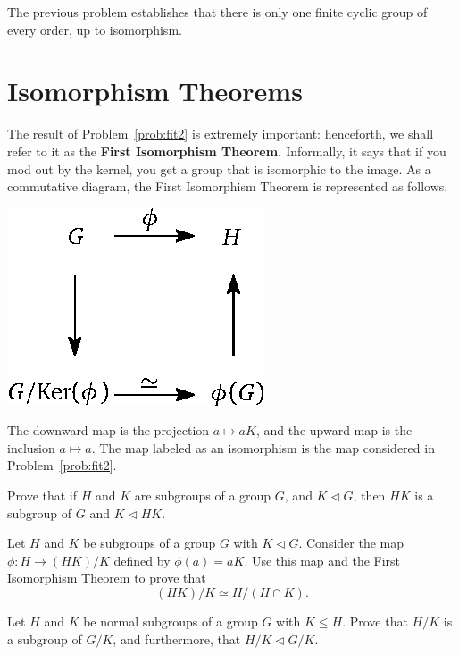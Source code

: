 The previous problem establishes that there is only one finite cyclic group of every order, up to isomorphism.

\section{Isomorphism Theorems}\label{sec:isothms}

The result of Problem~\ref{prob:fit2} is extremely important: henceforth, we shall refer to it as the \textbf{First Isomorphism Theorem.}
Informally, it says that if you mod out by the kernel, you get a group that is isomorphic to the image. As a commutative diagram, the First Isomorphism Theorem is represented as follows.
\begin{center}
\includegraphics{fit.eps}
\end{center}

The downward map is the projection \(a \mapsto aK\), and the upward map is the inclusion \(a \mapsto a\). The map labeled as an isomorphism is the map considered in Problem~\ref{prob:fit2}.

\begin{problem}
Prove that if \(H\) and \(K\) are subgroups of a group \(G\), and \(K \lhd G\), then \(HK\)  is a subgroup of \(G\) and \(K \lhd HK\).
\end{problem}

\begin{problem}
Let \(H\) and \(K\) be subgroups of a group \(G\) with \(K \lhd G\). Consider the map \(\phi : H \longrightarrow (HK)/K\) defined by \(\phi(a) = aK\). Use this map and the First Isomorphism Theorem to prove that \[(HK)/K \simeq H/(H\cap K).\]
\end{problem}

\begin{problem}
Let \(H\) and \(K\) be normal subgroups of a group \(G\) with \(K \leq H\). Prove that \(H/K\) is a subgroup of \(G/K\), and furthermore, that \(H/K \lhd G/K\).
\end{problem}

